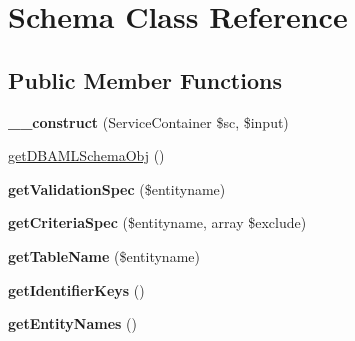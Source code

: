 \hypertarget{class_utopia_1_1_components_1_1_model_1_1_schema}{
\section{Schema Class Reference}
\label{class_utopia_1_1_components_1_1_model_1_1_schema}
}
\subsection*{Public Member Functions}
\begin{DoxyCompactItemize}
\item 
\hypertarget{class_utopia_1_1_components_1_1_model_1_1_schema_acf9dd03f3b8ab902439c82ddf78d0c07}{
{\bfseries \_\-\_\-construct} (ServiceContainer \$sc, \$input)}
\label{class_utopia_1_1_components_1_1_model_1_1_schema_acf9dd03f3b8ab902439c82ddf78d0c07}

\item 
\hyperlink{class_utopia_1_1_components_1_1_model_1_1_schema_ae8b01a693445c2f1d4baed5e343a1654}{getDBAMLSchemaObj} ()
\item 
\hypertarget{class_utopia_1_1_components_1_1_model_1_1_schema_a94db060d9b14058afbe94298faf3124f}{
{\bfseries getValidationSpec} (\$entityname)}
\label{class_utopia_1_1_components_1_1_model_1_1_schema_a94db060d9b14058afbe94298faf3124f}

\item 
\hypertarget{class_utopia_1_1_components_1_1_model_1_1_schema_ac68bd214d1eba19563c599ff3f83c8c3}{
{\bfseries getCriteriaSpec} (\$entityname, array \$exclude)}
\label{class_utopia_1_1_components_1_1_model_1_1_schema_ac68bd214d1eba19563c599ff3f83c8c3}

\item 
\hypertarget{class_utopia_1_1_components_1_1_model_1_1_schema_aad3059dfec80bd4c5d5e8f8ccf85c1d1}{
{\bfseries getTableName} (\$entityname)}
\label{class_utopia_1_1_components_1_1_model_1_1_schema_aad3059dfec80bd4c5d5e8f8ccf85c1d1}

\item 
\hypertarget{class_utopia_1_1_components_1_1_model_1_1_schema_ad19673831d2323103df5f33948c6c4f9}{
{\bfseries getIdentifierKeys} ()}
\label{class_utopia_1_1_components_1_1_model_1_1_schema_ad19673831d2323103df5f33948c6c4f9}

\item 
\hypertarget{class_utopia_1_1_components_1_1_model_1_1_schema_a1ce7f843d7aab64efdfa856de8eab6fe}{
{\bfseries getEntityNames} ()}
\label{class_utopia_1_1_components_1_1_model_1_1_schema_a1ce7f843d7aab64efdfa856de8eab6fe}


\end{DoxyCompactItemize}
